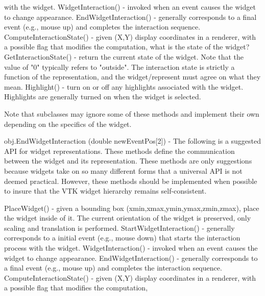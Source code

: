 \begin{DoxyItemize}
\begin{DoxyPre}
                            with the widget.
 WidgetInteraction() - invoked when an event causes the widget to change 
                       appearance.
 EndWidgetInteraction() - generally corresponds to a final event (e.g., mouse up)
                          and completes the interaction sequence.
 ComputeInteractionState() - given (X,Y) display coordinates in a renderer, with a
                             possible flag that modifies the computation,
                             what is the state of the widget?
 GetInteractionState() - return the current state of the widget. Note that the
                         value of "0" typically refers to "outside". The 
                         interaction state is strictly a function of the
                         representation, and the widget/represent must agree
                         on what they mean.
 Highlight() - turn on or off any highlights associated with the widget.
               Highlights are generally turned on when the widget is selected.
 \end{DoxyPre}
 Note that subclasses may ignore some of these methods and implement their own depending on the specifics of the widget.  
\item {\ttfamily obj.\-End\-Widget\-Interaction (double new\-Event\-Pos\mbox{[}2\mbox{]})} -\/ The following is a suggested A\-P\-I for widget representations. These methods define the communication between the widget and its representation. These methods are only suggestions because widgets take on so many different forms that a universal A\-P\-I is not deemed practical. However, these methods should be implemented when possible to insure that the V\-T\-K widget hierarchy remains self-\/consistent. 
\begin{DoxyPre}
 PlaceWidget() - given a bounding box (xmin,xmax,ymin,ymax,zmin,zmax), place 
                 the widget inside of it. The current orientation of the widget 
                 is preserved, only scaling and translation is performed.
 StartWidgetInteraction() - generally corresponds to a initial event (e.g.,
                            mouse down) that starts the interaction process
                            with the widget.
 WidgetInteraction() - invoked when an event causes the widget to change 
                       appearance.
 EndWidgetInteraction() - generally corresponds to a final event (e.g., mouse up)
                          and completes the interaction sequence.
 ComputeInteractionState() - given (X,Y) display coordinates in a renderer, with a
                             possible flag that modifies the computation,

\end{DoxyPre}
\end{DoxyItemize}
